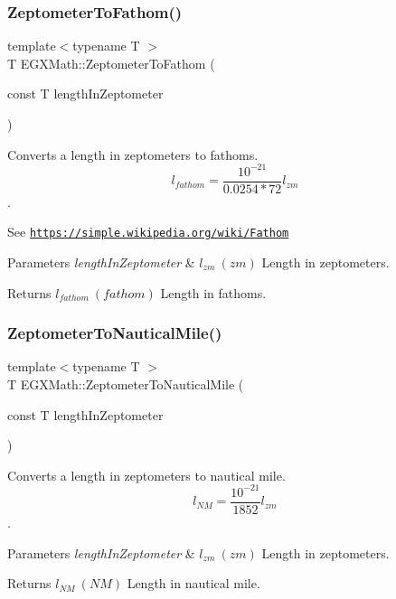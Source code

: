 \subsubsection{\texorpdfstring{Zeptometer\+To\+Fathom()}{ZeptometerToFathom()}}
{\footnotesize\ttfamily template$<$typename T $>$ \\
T E\+G\+X\+Math\+::\+Zeptometer\+To\+Fathom (\begin{DoxyParamCaption}\item[{const T}]{length\+In\+Zeptometer }\end{DoxyParamCaption})}



Converts a length in zeptometers to fathoms. \[ l_{fathom}= \frac{10^{-21}}{0.0254 * 72} l_{zm} \]. 

See \href{https://simple.wikipedia.org/wiki/Fathom}{\tt https\+://simple.\+wikipedia.\+org/wiki/\+Fathom} 
\begin{DoxyParams}{Parameters}
{\em length\+In\+Zeptometer} & $ l_{zm}\ (zm)$ Length in zeptometers. \\
\hline
\end{DoxyParams}
\begin{DoxyReturn}{Returns}
$ l_{fathom}\ (fathom)$ Length in fathoms. 
\end{DoxyReturn}
\mbox{\label{group___e_g_x_math-_conversions-_length_conversions-_s_i-_zeptometer-_nautical_ga9d6a1de6b4a8de39ba16da0a17cdca42}} 
\subsubsection{\texorpdfstring{Zeptometer\+To\+Nautical\+Mile()}{ZeptometerToNauticalMile()}}
{\footnotesize\ttfamily template$<$typename T $>$ \\
T E\+G\+X\+Math\+::\+Zeptometer\+To\+Nautical\+Mile (\begin{DoxyParamCaption}\item[{const T}]{length\+In\+Zeptometer }\end{DoxyParamCaption})}



Converts a length in zeptometers to nautical mile. \[ l_{NM}= \frac{10^{-21}}{1852} l_{zm} \]. 


\begin{DoxyParams}{Parameters}
{\em length\+In\+Zeptometer} & $ l_{zm}\ (zm)$ Length in zeptometers. \\
\hline
\end{DoxyParams}
\begin{DoxyReturn}{Returns}
$ l_{NM}\ (NM)$ Length in nautical mile. 
\end{DoxyReturn}
